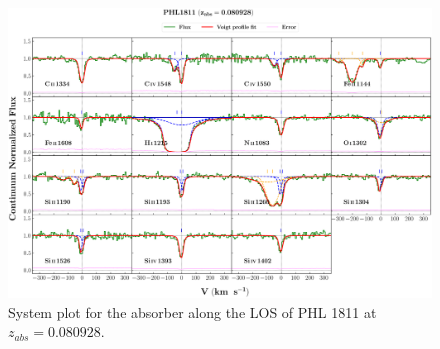   \restoregeometry

  \newpage
  \thispagestyle{empty}

  \begin{landscape}
  
  \begin{figure}
      \centering
      \vspace{-10mm}
      \hspace*{-20mm}
      \includegraphics[width=1.1\linewidth]{System-Plots/PHL1811_z=0.080928_sys_plot.png}
      \caption{System plot for the absorber along the LOS of PHL 1811 at $z_{abs} = 0.080928$. }
  \end{figure}
  
  \end{landscape}
  

